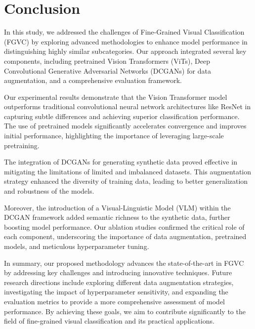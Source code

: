 \section{Conclusion}
\label{sec:conclusion}

In this study, we addressed the challenges of Fine-Grained Visual Classification (FGVC) by exploring advanced methodologies to enhance model performance in distinguishing highly similar subcategories. Our approach integrated several key components, including pretrained Vision Transformers (ViTs), Deep Convolutional Generative Adversarial Networks (DCGANs) for data augmentation, and a comprehensive evaluation framework.

Our experimental results demonstrate that the Vision Transformer model outperforms traditional convolutional neural network architectures like ResNet in capturing subtle differences and achieving superior classification performance. The use of pretrained models significantly accelerates convergence and improves initial performance, highlighting the importance of leveraging large-scale pretraining.

The integration of DCGANs for generating synthetic data proved effective in mitigating the limitations of limited and imbalanced datasets. This augmentation strategy enhanced the diversity of training data, leading to better generalization and robustness of the models.

Moreover, the introduction of a Visual-Linguistic Model (VLM) within the DCGAN framework added semantic richness to the synthetic data, further boosting model performance. Our ablation studies confirmed the critical role of each component, underscoring the importance of data augmentation, pretrained models, and meticulous hyperparameter tuning.

In summary, our proposed methodology advances the state-of-the-art in FGVC by addressing key challenges and introducing innovative techniques. Future research directions include exploring different data augmentation strategies, investigating the impact of hyperparameter sensitivity, and expanding the evaluation metrics to provide a more comprehensive assessment of model performance. By achieving these goals, we aim to contribute significantly to the field of fine-grained visual classification and its practical applications.

